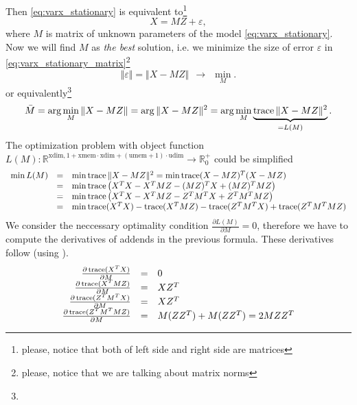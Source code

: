  Then \eqref{eq:varx_stationary} is equivalent to\footnote{please, notice that both of left side and right side are matrices}
 \begin{equation}
  \label{eq:varx_stationary_matrix}
  X = MZ + \varepsilon,
 \end{equation}
 where $M$ is matrix of unknown parameters of the model \eqref{eq:varx_stationary}.
 Now we will find $M$ as \emph{the best} solution, i.e. we minimize the size of error $\varepsilon$ in \eqref{eq:varx_stationary_matrix}\footnote{please, notice that we are talking about matrix norms}
 \begin{displaymath}
  \label{eq:eq:varx_stationary_matrix_eps}
  \Vert \varepsilon \Vert = \Vert X - MZ \Vert ~~ \rightarrow ~~ \min\limits_{M}.
 \end{displaymath}
 or equivalently\footnote{}
 \begin{displaymath}
   \bar{M} =  \arg \min\limits_{M} \Vert X - MZ \Vert =  \arg \Vert X - MZ \Vert^2 =  \arg \min\limits_{M} \underbrace{\operatorname{\mathrm{trace}}\Vert X - MZ \Vert^2}_{= L(M)}.
 \end{displaymath}
 The optimization problem with object function $L(M): \mathbb{R}^{\mathrm{xdim},1+\mathrm{xmem}\cdot\mathrm{xdim}+(\mathrm{umem}+1)\cdot\mathrm{udim}} \rightarrow \mathbb{R}^{+}_0$ could be simplified 
 \begin{displaymath}
  \begin{array}{rcl}
   \min L(M) & = & \min \operatorname{\mathrm{trace}} \Vert X - MZ \Vert^2 = \min \operatorname{\mathrm{trace}} (X-MZ)^T(X-MZ) \\
        & = & \min \operatorname{\mathrm{trace}} \left( X^TX - X^TMZ - (MZ)^TX + (MZ)^T MZ \right) \\
        & = & \min \operatorname{\mathrm{trace}} \left( X^TX - X^TMZ - Z^TM^TX + Z^T M^T MZ \right) \\
        & = & \min \operatorname{\mathrm{trace}} (X^TX) - \operatorname{\mathrm{trace}} (X^TMZ) - \operatorname{\mathrm{trace}} (Z^TM^TX) + \operatorname{\mathrm{trace}} (Z^T M^T MZ)
  \end{array}
 \end{displaymath}
 We consider the neccessary optimality condition $\frac{\partial L(M)}{\partial M} = 0$, therefore we have to compute the derivatives of addends in the previous formula.
 These derivatives follow (using \cite{matrix_cookbook}).
 \begin{displaymath}
  \begin{array}{rcl}
   \frac{\partial \operatorname{\mathrm{trace}} (X^TX)}{\partial M} & = & 0 \\
   \frac{\partial \operatorname{\mathrm{trace}} (X^TMZ)}{\partial M} & = & XZ^T \\
   \frac{\partial \operatorname{\mathrm{trace}} (Z^TM^TX)}{\partial M} & = & XZ^T \\
   \frac{\partial \operatorname{\mathrm{trace}} (Z^TM^T M Z)}{\partial M} & = & M(ZZ^T) + M (ZZ^T) = 2MZZ^T
  \end{array}
 \end{displaymath}
